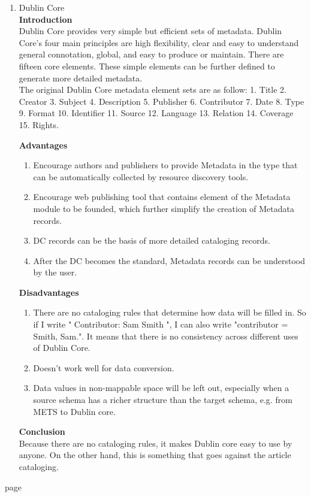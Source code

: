 \begin{enumerate}
	\item Dublin Core\\
	{\bf Introduction}\\
	Dublin Core provides very simple but efficient sets of metadata.
	Dublin Core’s four main principles are high flexibility, 
	clear and easy to understand general connotation, global, and easy to produce or maintain.	There are fifteen core elements.
	 These simple elements can be further defined to generate more detailed metadata.\\
	The original Dublin Core metadata element sets are as follow:
	1. Title 2. Creator 3. Subject 4. Description 5. Publisher 
	6. Contributor 7. Date 8. Type 9. Format 10. Identifier
	11. Source 12. Language 13. Relation 14. Coverage 15. Rights.
	\cite{NISO2012}
	
	{\bf Advantages}
	\begin{enumerate}
		\item Encourage authors and publishers to provide Metadata in the type that can be automatically collected by resource discovery tools.
		\item Encourage web publishing tool that contains element of the Metadata module to be founded, which further simplify the creation of Metadata records.
		\item DC records can be the basis of more detailed cataloging records.
		\item After the DC becomes the standard, Metadata records can be understood by the user.
	\end{enumerate}	
		
	{\bf Disadvantages}
	\begin{enumerate}
		\item There are no cataloging rules that determine how data will be filled in. 
		So if I write " Contributor: Sam Smith ", I can also write "contributor = Smith, Sam.". 
			It means that there is no consistency across different uses of Dublin Core.
		\item Doesn't work well for data conversion.
		\item Data values in non-mappable space will be left out, especially when a source schema has a richer structure than the target schema, e.g. from METS to Dublin core.
	\end{enumerate}
	{\bf Conclusion}\\
	Because there are no cataloging rules, it makes Dublin core easy to use by anyone. 
	On the other hand, this is something that goes against the article cataloging.
		
\end{enumerate}

\new page %







